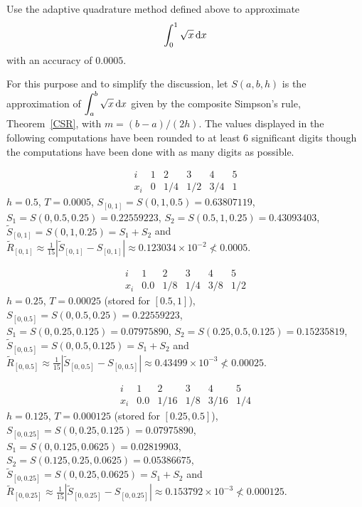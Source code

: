 \begin{egg}
Use the adaptive quadrature method defined above to approximate
\[
\int_0^1 \sqrt{x}\,\mathrm{d}x
\]
with an accuracy of $0.0005$.

For this purpose and to simplify the discussion, let $S(a,b,h)$ is the
approximation of $\displaystyle \int_a^b \sqrt{x}\,\mathrm{d}x$ given by the
composite Simpson's rule, Theorem~\ref{CSR}, with $m = (b-a)/(2h)$.
The values displayed in the following computations have been rounded
to at least $6$ significant digits though the computations have been
done with as many digits as possible.

\[
\begin{array}{c|ccccc}
i & 1 & 2 & 3 & 4 & 5 \\
\hline
x_i & 0 & 1/4 & 1/2 & 3/4 & 1
\end{array}
\]
$h=0.5$, $T=0.0005$, $S_{[0,1]} = S(0,1,0.5) = 0.63807119$,\\
$S_1 = S(0,0.5,0.25) = 0.22559223$, $S_2 = S(0.5,1,0.25) = 0.43093403$,\\
$\tilde{S}_{[0,1]} = S(0,1,0.25) = S_1+S_2$ and
$\displaystyle \tilde{R}_{[0,1]} \approx \frac{1}{15}\left|
\tilde{S}_{[0,1]} -  S_{[0,1]}\right|
\approx 0.123034 \times 10^{-2} \not< 0.0005$.

\[
\begin{array}{c|ccccc}
i & 1 & 2 & 3 & 4 & 5 \\
\hline
x_i & 0.0 & 1/8 & 1/4 & 3/8 & 1/2
\end{array}
\]
$h=0.25$, $T=0.00025$ (stored for $[0.5, 1]$),
$S_{[0,0.5]} = S(0,0.5,0.25) = 0.22559223$,\\
$S_1 = S(0,0.25, 0.125) = 0.07975890$,
$S_2 = S(0.25,0.5,0.125) = 0.15235819$,\\
$\tilde{S}_{[0,0.5]} = S(0,0.5,0.125) = S_1+S_2$ and\\
$\displaystyle \tilde{R}_{[0,0.5]} \approx \frac{1}{15}\left|
\tilde{S}_{[0,0.5]} - S_{[0,0.5]}\right|
\approx 0.43499 \times 10^{-3} \not< 0.00025$.

\[
\begin{array}{c|ccccc}
i & 1 & 2 & 3 & 4 & 5 \\
\hline
x_i & 0.0 & 1/16 & 1/8 & 3/16 & 1/4
\end{array}
\]
$h=0.125$, $T=0.000125$ (stored for $[0.25, 0.5]$),
$S_{[0,0.25]} = S(0,0.25,0.125) = 0.07975890$,\\
$S_1 = S(0,0.125, 0.0625) = 0.02819903$,
$S_2 = S(0.125, 0.25, 0.0625)= 0.05386675$,\\
$\tilde{S}_{[0,0.25]} = S(0,0.25,0.0625) = S_1+S_2$ and\\
$\displaystyle \tilde{R}_{[0,0.25]} \approx \frac{1}{15}\left|
\tilde{S}_{[0,0.25]} - S_{[0,0.25]} \right|
\approx 0.153792 \times 10^{-3} \not< 0.000125$.


\end{egg}
